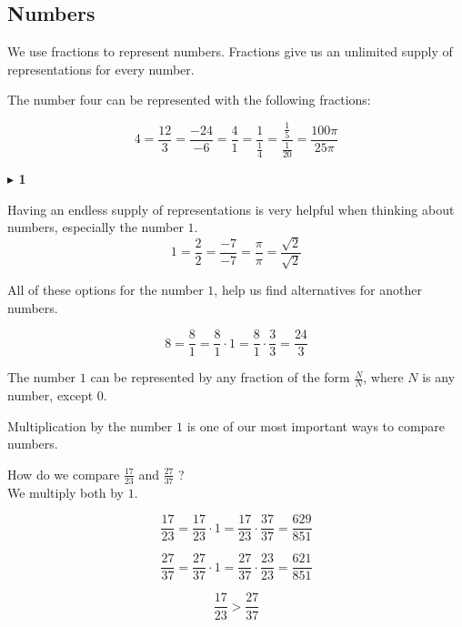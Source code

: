 \documentclass{ximera}
\begin{document}
\subsection*{Numbers} 



We use fractions to represent numbers.  Fractions give us an unlimited supply of representations for every number.

The number four can be represented with the following fractions:

\[
4 = \frac{12}{3} = \frac{-24}{-6} = \frac{4}{1} = \frac{1}{\tfrac{1}{4}} = \frac{\tfrac{1}{5}}{\tfrac{1}{20}} = \frac{100\pi}{25\pi}
\]








\textbf{\textcolor{purple!85!blue}{$\blacktriangleright$ 1}} 



Having an endless supply of representations is very helpful when thinking about numbers, especially the number $1$. \\


\[
1 = \frac{2}{2} = \frac{-7}{-7} = \frac{\pi}{\pi} = \frac{\sqrt{2}}{\sqrt{2}} 
\]


All of these options for the number $1$, help us find alternatives for another numbers.


\[
8 = \frac{8}{1} = \frac{8}{1} \cdot 1 = \frac{8}{1} \cdot \frac{3}{3} = \frac{24}{3}
\]




\begin{idea}

The number $1$ can be represented by any fraction of the form $\frac{N}{N}$, where $N$ is any number, except $0$.


\end{idea}







Multiplication by the number $1$ is one of our most important ways to compare numbers.




\begin{example}

How do we compare $\frac{17}{23}$ and $\frac{27}{37}$ ? \\

We multiply both by $1$.


\[
\frac{17}{23} = \frac{17}{23} \cdot 1 = \frac{17}{23} \cdot \frac{37}{37} = \frac{629}{851}
\]


\[
\frac{27}{37} = \frac{27}{37} \cdot 1 = \frac{27}{37} \cdot \frac{23}{23} = \frac{621}{851}
\]



\[
\frac{17}{23} > \frac{27}{37}
\]


\end{example}
\end{document}
